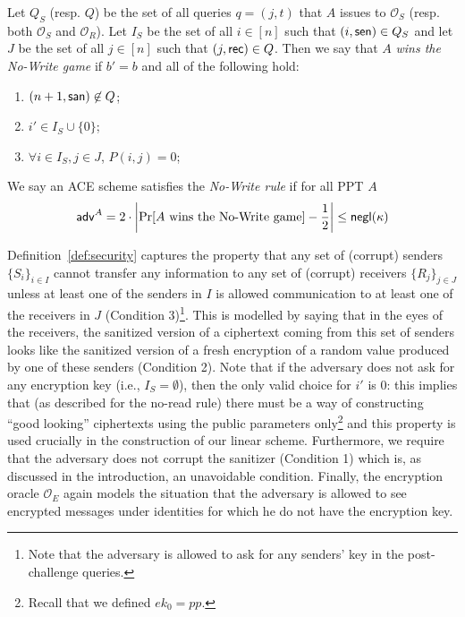\documentclass{llncs}
\begin{document}
\begin{defi}
\begin{center}
\begin{small}
\begin{tabular}{| p{6.5cm} | p{5cm} |}
	\\
	\hline
	\end{tabular}
\end{small}
\end{center}
Let $Q_S$ (resp. $Q$) be the set of all queries $q=(j,t)$ that $A$ issues to $\mathcal{O}_S$ (resp. both $\mathcal{O}_S$ and $\mathcal{O}_R$). Let $I_S$ be the set of all $i\in[n]$ such that $(i,\mathsf{sen})\in Q_S$ and let $J$ be the set of all $j\in [n]$ such that $(j,\mathsf{rec})\in Q$. Then we say that $A$ \emph{wins the No-Write game} if $b'=b$ and all of the following hold:
\begin{enumerate}
	\item $(n+1,\mathsf{san})\not\in Q$;
	\item $i'\in I_S \cup \{0\}$;
	\item $\forall i\in I_S,j\in J$,  $P(i,j)=0$;
\end{enumerate}
We say an ACE scheme satisfies the \emph{No-Write rule} if for all PPT $A$
$$
\mathsf{adv}^{A} = 2\cdot \left|\Pr[A \mbox{ wins the No-Write game}]-\frac{1}{2}\right|\leq \mathsf{negl}(\kappa)
$$ 
\end{defi}


Definition~\ref{def:security} captures the property that any set of (corrupt) senders $\{S_i\}_{i\in I}$ cannot transfer any information to any set of (corrupt) receivers $\{R_j\}_{j\in J}$ unless at least one of the senders in $I$ is allowed communication to at least one of the receivers in $J$ (Condition 3)\footnote{Note that the adversary is allowed to ask for any senders' key in the post-challenge queries.}. This is modelled by saying that in the eyes of the receivers, the sanitized version of a ciphertext coming from this set of senders looks like the sanitized version of a fresh encryption of a random value produced by one of these senders (Condition 2). Note that if the adversary does not ask for any encryption key (i.e., $I_S=\emptyset$), then the only valid choice for $i'$ is $0$: this implies that (as described for the no-read rule) there must be a way of constructing ``good looking'' ciphertexts using the public parameters only\footnote{Recall that we defined $ek_0=pp$.} and this property is used crucially in the construction of our linear scheme. 
Furthermore, we require that the adversary does not corrupt the sanitizer (Condition 1) which is, as discussed in the introduction, an unavoidable condition. 
Finally, the encryption oracle $\mathcal{O}_E$ again models the situation that the adversary is allowed to see encrypted messages under identities for which he do not have the encryption key.
\end{document}
